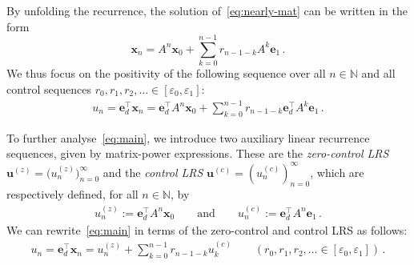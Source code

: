 \documentclass[a4paper,UKenglish,cleveref, autoref, thm-restate]{lipics-v2021}
\begin{document}
By unfolding the recurrence,
the solution of~\eqref{eq:nearly-mat} can be written in the form \[\boldsymbol x_n = A^n \boldsymbol x_0+\sum_{k=0}^{n-1} r_{n-1-k}A^k\boldsymbol e_1 \, .\]
We thus focus on the positivity of the following sequence over all $n\in\mathbb N$ and all
control sequences $r_0,r_1,r_2,\ldots \in [\varepsilon_0,\varepsilon_1]$: 
\begin{gather}
  u_n =  \boldsymbol e_d^\top \boldsymbol x_n = \boldsymbol e_d^\top A^n
   \boldsymbol x_0 + \sum_{k=0}^{n-1} r_{n-1-k}
   \boldsymbol e_d^\top A^k \boldsymbol e_1 \, .
\label{eq:main}
\end{gather} 

To further analyse~\eqref{eq:main}, we introduce two auxiliary linear
recurrence sequences, given by matrix-power expressions.
These are the \emph{zero-control LRS} $\boldsymbol
u^{(z)}=\big(u^{(z)}_n\big)_{n=0}^\infty$ and the 
\emph{control LRS}
$\boldsymbol u^{(c)} = (u^{(c)}_n)_{n=0}^\infty$, which are
respectively defined, for all $n \in \mathbb N$, by
\begin{gather}
u^{(z)}_n:=\boldsymbol e_d^\top A^n \boldsymbol x_0\qquad\text{and}\qquad
  u^{(c)}_n := \boldsymbol e_d^\top A^n \boldsymbol e_1\, .
  \label{eq:zero-control}
  \end{gather}
We can rewrite~\eqref{eq:main} in terms of the zero-control and control LRS as follows:
\begin{gather}
   u_n = \boldsymbol e_d^\top \boldsymbol x_n = u_n^{(z)} + \sum_{k=0}^{n-1}
   r_{n-1-k} u_k^{(c)} \qquad (r_0,r_1,r_2,\ldots \in [\varepsilon_0,\varepsilon_1])\, .
    \label{eq:main2}
\end{gather}
\end{document}
